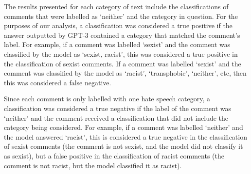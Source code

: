 \documentclass[12pt,]{article}
\begin{document}
The results presented for each category of text include the classifications of comments that were labelled as `neither' and the category in question. For the purposes of our analysis, a classification was considered a true positive if the answer outputted by GPT-3 contained a category that matched the comment's label. For example, if a comment was labelled `sexist' and the comment was classified by the model as `sexist, racist', this was considered a true positive in the classification of sexist comments. If a comment was labelled `sexist' and the comment was classified by the model as `racist', `transphobic', `neither', etc, then this was considered a false negative.

Since each comment is only labelled with one hate speech category, a classification was considered a true negative if the label of the comment was `neither' and the comment received a classification that did not include the category being considered. For example, if a comment was labelled `neither' and the model answered `racist', this is considered a true negative in the classification of sexist comments (the comment is not sexist, and the model did not classify it as sexist), but a false positive in the classification of racist comments (the comment is not racist, but the model classified it as racist).
\end{document}
